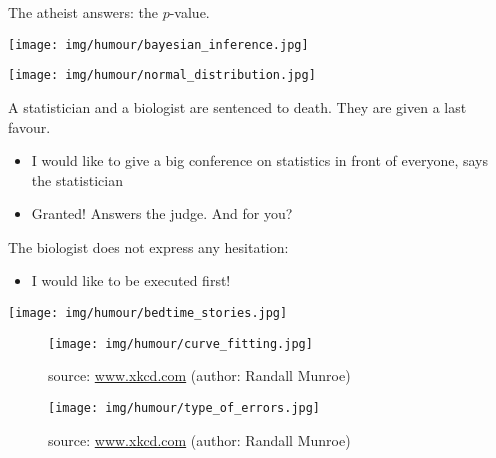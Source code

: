	The atheist answers: the $p$-value.
		
	\begin{center}
	\texttt{[image: img/humour/bayesian\_inference.jpg]}
	\end{center}
	
	\begin{center}\underline{\hspace{5 cm}}\end{center}
	\begin{center}
	\texttt{[image: img/humour/normal\_distribution.jpg]}
	\end{center}
	\begin{center}\underline{\hspace{5 cm}}\end{center}
	
	A statistician and a biologist are sentenced to death. They are given a last favour.
	\begin{itemize}
		\item I would like to give a big conference on statistics in front of everyone, says the statistician
		\item Granted! Answers the judge. And for you?
	\end{itemize}
	The biologist does not express any hesitation:
	\begin{itemize}
		\item I would like to be executed first!
	\end{itemize}

	
	\begin{center}
	\texttt{[image: img/humour/bedtime\_stories.jpg]}
	\end{center}
	
	\begin{center}\underline{\hspace{5 cm}}\end{center}

	\begin{figure}[H]
		\centering
		\texttt{[image: img/humour/curve\_fitting.jpg]}
		\caption[]{source: \url{www.xkcd.com} (author: Randall Munroe)}
	\end{figure}
	
	\begin{figure}[H]
		\centering
		\texttt{[image: img/humour/type\_of\_errors.jpg]}
		\caption[]{source: \url{www.xkcd.com} (author: Randall Munroe)}
	\end{figure}
	
	\begin{center}\underline{\hspace{5 cm}}\end{center}
	
